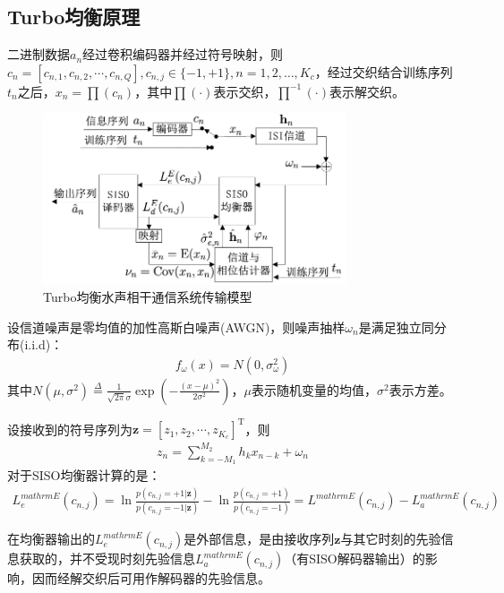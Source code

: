 \subsection{Turbo均衡原理}
二进制数据$a_n$经过卷积编码器并经过符号映射，则$c_n=[c_{n,1},c_{n,2},\cdots,c_{n,Q}],c_{n,j}\in\{-1,+1\},n=1,2,\ldots,K_c$，经过交织结合训练序列$t_n$之后，$x_n=\prod(c_n)$，其中$\prod(\cdot)$表示交织，$\prod^{-1}(\cdot)$表示解交织。

\begin{figure}[htb]
  \begin{center}
    \includegraphics[width=0.8\textwidth]{images/totalcomm2.pdf}
  \end{center}
  \caption{Turbo均衡水声相干通信系统传输模型}
  \label{fig:2.4}
\end{figure}

设信道噪声是零均值的加性高斯白噪声(AWGN)，则噪声抽样$\omega_n$是满足独立同分布(i.i.d)：
\begin{eqnarray}
    f_{\omega}(x)=N(0,\sigma_{\omega}^2)
    \label{equ:2.32}
\end{eqnarray}
其中$N(\mu,\sigma^2)\overset{\Delta}{=}\frac{1}{\sqrt{2\pi}\sigma}\exp\left(-\frac{(x-\mu)^2}{2\sigma^2}\right)$，$\mu$表示随机变量的均值，$\sigma^2$表示方差。

设接收到的符号序列为$\mathbf{z}=[z_1,z_2,\cdots,z_{K_c}]^{\mathrm{T}}$，则
\begin{eqnarray}
    z_n=\sum_{k=-M_1}^{M_2}h_kx_{n-k}+\omega_n
    \label{equ:2.32}
\end{eqnarray}
对于SISO均衡器计算的是：
\begin{eqnarray}
    L_e^{mathrm{E}}(c_{n,j})=\ln\frac{p(c_{n,j}=+1|\mathbf{z})}{p(c_{n,j}=-1|\mathbf{z})}-\ln\frac{p(c_{n,j}=+1)}{p(c_{n,j}=-1)}=L^{mathrm{E}}(c_{n,j})-L_a^{mathrm{E}}(c_{n,j})
    \label{equ:2.33}
\end{eqnarray}

在均衡器输出的$L_e^{mathrm{E}}(c_{n,j})$是外部信息，是由接收序列$\mathbf{z}$与其它时刻的先验信息获取的，并不受现时刻先验信息$L_a^{mathrm{E}}(c_{n,j})$（有SISO解码器输出）的影响，因而经解交织后可用作解码器的先验信息。

